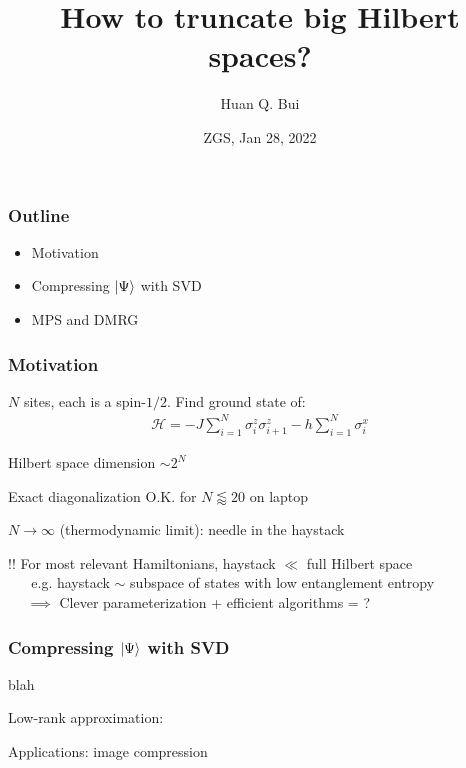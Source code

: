 \documentclass{beamer}
\title[\textcolor{white}{{}}]
{
	How to truncate big Hilbert spaces? 
}
\author[Bui] %
{Huan Q. Bui
	}
\institute[MIT] %
{
}
\date{ZGS, Jan 28, 2022}
\theoremstyle{definition}
\begin{document}
 
\frame{\titlepage}


\begin{frame}
	\frametitle{Outline}
	\begin{itemize}
		\item Motivation
		\item Compressing $\ket{\Psi}$ with SVD
		\item MPS and DMRG
	\end{itemize}
\end{frame}


\begin{frame}
	\frametitle{Motivation}
	
	$N$ sites, each is a spin-$1/2$. Find ground state of:
	\begin{align*}
		\mathcal{H} = - J \sum_{i=1}^N \sigma_i^z \sigma_{i+1}^z - h \sum_{i=1}^N \sigma^x_i
	\end{align*}	
	
	
	Hilbert space dimension $\sim 2^N$\\
	
	\vspace{8pt}
	
	Exact diagonalization O.K. for $N \lessapprox 20$ on laptop\\
	
	\vspace{8pt}
	
	$N \to \infty$ (thermodynamic limit): needle in the haystack\\
	
	\vspace{8pt}
	
	{$\boxed{!!}$ For most relevant Hamiltonians, haystack $\ll$ full Hilbert space }\\
	\vspace{2pt}
	{$\quad\,\,\,\,$e.g. haystack $\sim$ subspace of states with low entanglement entropy }\\
	\vspace{2pt}
	{$\quad\,\,\implies$ Clever parameterization + efficient algorithms = \smiley{}?}
	
		
	
\end{frame}



\begin{frame}
	\frametitle{Compressing $\ket{\Psi}$ with SVD}
	
	\begin{theorem}
		blah
	\end{theorem}
	
	
	
	Low-rank approximation: 
	\begin{theorem}
		
	\end{theorem}
	
	
	Applications: image compression
\end{frame}
\end{document}
